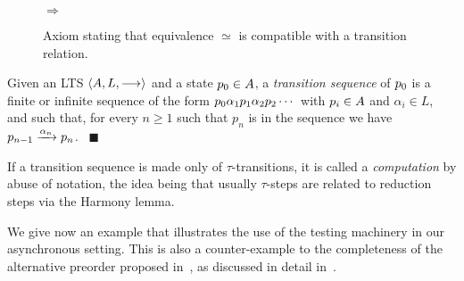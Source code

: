 \begin{figure}
  \hrulefill
  \begin{center}
    $\Rightarrow$
  \end{center}
    \vspace{-1em}
  \caption{Axiom stating that equivalence $\simeq$ is compatible with
    a transition relation.}
\label{fig:Axiom-LtsEq}
\hrulefill
\end{figure}



 \begin{definition} %
   \label{def:inf-transition-sequence}
   Given an LTS  $\langle  A ,  L ,  \mathrel{\overset{}\longrightarrow}  \rangle$ and a state $p_0 \in
  A$, a \emph{transition sequence} of $p_0$ is a finite or infinite
  sequence of the form $p_0 \alpha_1 p_1 \alpha_2
  p_2 \cdots$ with $p_i \in A$ and $\alpha_i \in L$, and
  such that, for every $n \geq 1$ such that $p_n$ is in the sequence we have
  $p_{n-1} \xrightarrow{\alpha_n} p_{n}$.
~\hfill$\blacksquare$
 \end{definition}
 \noindent
 If a transition sequence %
 is made only of  $\tau$-transitions, 
 it is called a {\em computation} by abuse of notation, the idea being that
 usually $\tau$-steps are related to reduction steps via the Harmony
 lemma.

We give now an example that illustrates the use of the testing
machinery in our asynchronous setting. This is also a counter-example
to the completeness of the alternative preorder
proposed in~\cite{DBLP:conf/fsttcs/CastellaniH98}, as discussed
in detail in~.




